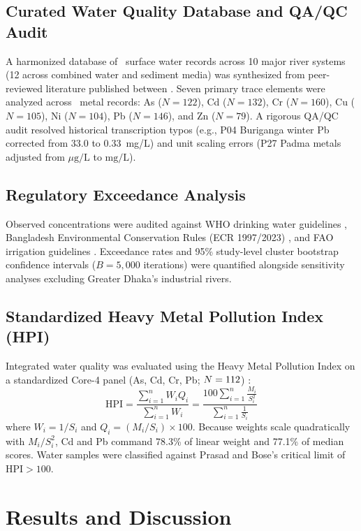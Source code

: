 \documentclass[conference]{IEEEtran}
\begin{document}
\subsection{Curated Water Quality Database and QA/QC Audit}
A harmonized database of \TotalWaterRecords\ surface water records across 10 major river systems (12 across combined water and sediment media) was synthesized from peer-reviewed literature published between \StudyWindowYears. Seven primary trace elements were analyzed across \TotalMetalRecords\ metal records: As ($N=122$), Cd ($N=132$), Cr ($N=160$), Cu ($N=105$), Ni ($N=104$), Pb ($N=146$), and Zn ($N=79$). A rigorous QA/QC audit resolved historical transcription typos (e.g., P04 Buriganga winter Pb corrected from 33.0 to 0.33~mg/L) and unit scaling errors (P27 Padma metals adjusted from $\mu\text{g/L}$ to $\text{mg/L}$).

\subsection{Regulatory Exceedance Analysis}
Observed concentrations were audited against WHO drinking water guidelines \cite{WHO2022}, Bangladesh Environmental Conservation Rules (ECR 1997/2023) \cite{ECR2023}, and FAO irrigation guidelines \cite{FAO1985}. Exceedance rates and 95\% study-level cluster bootstrap confidence intervals ($B=5,000$ iterations) were quantified alongside sensitivity analyses excluding Greater Dhaka's industrial rivers.

\subsection{Standardized Heavy Metal Pollution Index (HPI)}
Integrated water quality was evaluated using the Heavy Metal Pollution Index on a standardized Core-4 panel (As, Cd, Cr, Pb; $N=112$) \cite{Mohan1996,Prasad2001}:
\begin{equation}
\mathrm{HPI} = \frac{\sum_{i=1}^n W_i Q_i}{\sum_{i=1}^n W_i} = \frac{100 \sum_{i=1}^n \frac{M_i}{S_i^2}}{\sum_{i=1}^n \frac{1}{S_i}}
\end{equation}
where $W_i = 1/S_i$ and $Q_i = (M_i/S_i) \times 100$. Because weights scale quadratically with $M_i/S_i^2$, Cd and Pb command 78.3\% of linear weight and 77.1\% of median scores. Water samples were classified against Prasad and Bose's critical limit of $\mathrm{HPI} > 100$.

\section{Results and Discussion}
\end{document}
